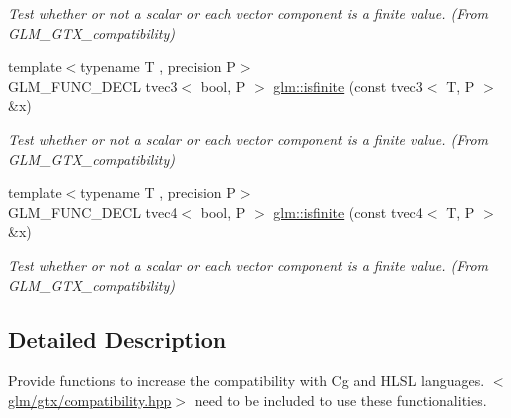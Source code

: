 \begin{DoxyCompactItemize}
\begin{DoxyCompactList}\small\item\em Test whether or not a scalar or each vector component is a finite value. (From G\-L\-M\-\_\-\-G\-T\-X\-\_\-compatibility) \end{DoxyCompactList}\item 
\hypertarget{group__gtx__compatibility_ga1be9593d810fceb278a2854da8a25273}{{\footnotesize template$<$typename T , precision P$>$ }\\G\-L\-M\-\_\-\-F\-U\-N\-C\-\_\-\-D\-E\-C\-L tvec3$<$ bool, P $>$ \hyperlink{group__gtx__compatibility_ga1be9593d810fceb278a2854da8a25273}{glm\-::isfinite} (const tvec3$<$ T, P $>$ \&x)}\label{group__gtx__compatibility_ga1be9593d810fceb278a2854da8a25273}

\begin{DoxyCompactList}\small\item\em Test whether or not a scalar or each vector component is a finite value. (From G\-L\-M\-\_\-\-G\-T\-X\-\_\-compatibility) \end{DoxyCompactList}\item 
\hypertarget{group__gtx__compatibility_ga8c6a59e2f2ac84fba0c5932f1c35bf7a}{{\footnotesize template$<$typename T , precision P$>$ }\\G\-L\-M\-\_\-\-F\-U\-N\-C\-\_\-\-D\-E\-C\-L tvec4$<$ bool, P $>$ \hyperlink{group__gtx__compatibility_ga8c6a59e2f2ac84fba0c5932f1c35bf7a}{glm\-::isfinite} (const tvec4$<$ T, P $>$ \&x)}\label{group__gtx__compatibility_ga8c6a59e2f2ac84fba0c5932f1c35bf7a}

\begin{DoxyCompactList}\small\item\em Test whether or not a scalar or each vector component is a finite value. (From G\-L\-M\-\_\-\-G\-T\-X\-\_\-compatibility) \end{DoxyCompactList}\end{DoxyCompactItemize}


\subsection{Detailed Description}
Provide functions to increase the compatibility with Cg and H\-L\-S\-L languages. $<$\hyperlink{compatibility_8hpp}{glm/gtx/compatibility.\-hpp}$>$ need to be included to use these functionalities. 